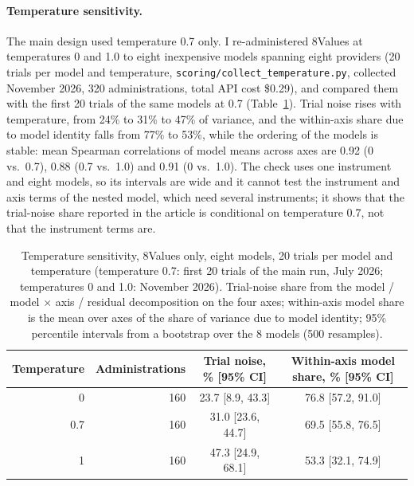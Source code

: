 \documentclass[12pt]{article}
\begin{document}
\paragraph{Temperature sensitivity.} The main design used temperature 0.7 only. I
re-administered 8Values at temperatures 0 and 1.0 to eight inexpensive models spanning
eight providers (20 trials per model and temperature,
\texttt{scoring/collect\_temperature.py}, collected November 2026, 320
administrations, total API cost \$0.29), and compared them with the first 20 trials of the same
models at 0.7 (Table~\ref{stab:temp}). Trial noise rises with temperature, from 24\% to 31\% to
47\% of variance, and the within-axis share due to model identity falls from 77\% to 53\%, while
the ordering of the models is stable: mean Spearman correlations of model means across axes are
0.92 (0 vs.\ 0.7), 0.88 (0.7 vs.\ 1.0) and 0.91 (0 vs.\ 1.0). The check uses one instrument and
eight models, so its intervals are wide and it cannot test the instrument and axis terms of the
nested model, which need several instruments; it shows that the trial-noise share reported in the article
is conditional on temperature 0.7, not that the instrument terms are.

\begin{table}[H]
\centering
\caption{Temperature sensitivity, 8Values only, eight models, 20 trials per model and temperature
(temperature 0.7: first 20 trials of the main run, July 2026; temperatures 0 and 1.0: November 2026).
Trial-noise share from the model / model $\times$ axis / residual decomposition on the four axes;
within-axis model share is the mean over axes of the share of variance due to model identity;
95\% percentile intervals from a bootstrap over the 8 models (500 resamples).}
\label{stab:temp}
\small
\begin{tabular}{rrcc}
\toprule
Temperature & Administrations & Trial noise, \% [95\% CI] & Within-axis model share, \% [95\% CI] \\
\midrule
0 & 160 & 23.7 [8.9, 43.3] & 76.8 [57.2, 91.0] \\
0.7 & 160 & 31.0 [23.6, 44.7] & 69.5 [55.8, 76.5] \\
1 & 160 & 47.3 [24.9, 68.1] & 53.3 [32.1, 74.9] \\
\bottomrule
\end{tabular}
\end{table}
\end{document}

